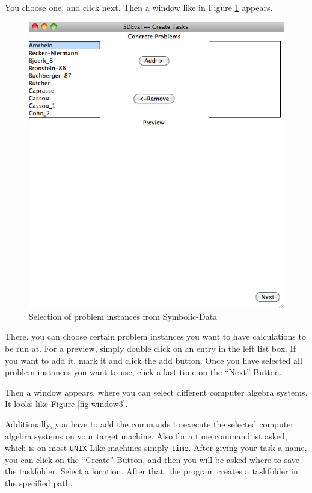 \documentclass[11pt,a4paper]{amsart}
\numberwithin{equation}{section}
\theoremstyle{definition}
\begin{document}
\newpage
You choose one, and click next. Then a window like in Figure \ref{fig:window2} appears.

\begin{figure}[ht]
    \includegraphics[width=1\textwidth]{pics/window2.png}
    \caption{Selection of problem instances from Symbolic-Data}
    \label{fig:window2}
\end{figure}

There, you can choose certain problem instances you want to have calculations to be run at. For a preview, simply double click on an entry in the left list box. If you want to add it, mark it and click the add button. Once you have selected all problem instances you want to use, click a last time on the ``Next''-Button.

\newpage
Then a window appears, where you can select different computer algebra systems. It looks like Figure \ref{fig:window3}.

Additionally, you have to add the commands to execute the selected computer algebra systems on your target machine. Also for a time command ist asked, which is on most \texttt{UNIX}-Like machines simply \texttt{time}. After giving your task a name, you can click on the ``Create''-Button, and then you will be asked where to save the taskfolder. Select a location. After that, the program creates a taskfolder in the specified path.
\end{document}
